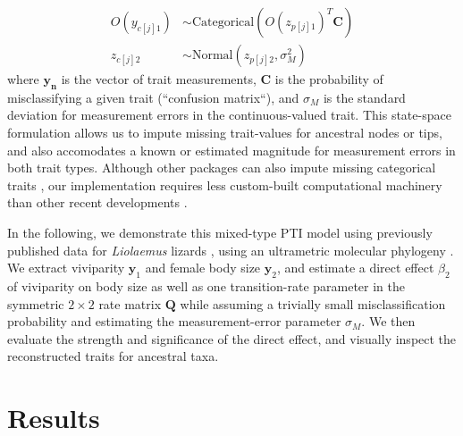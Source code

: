 \documentclass[11pt]{article}
\newcommand{\vect}[1]{\bm{#1}}
\newcommand{\mat}[1]{\bm{#1}}
\begin{document}
\begin{align}
    O(y_{c[j]1}) &\sim \mathrm{Categorical}\left( O(z_{p[j]1})^T \mat{C} \right) \\
    z_{c[j]2} &\sim \mathrm{Normal}\left( z_{p[j]2}, \sigma_M^2 \right)    
\end{align}
where $\vect{y_n}$ is the vector of trait measurements, $\mat{C}$ is the probability of misclassifying a given trait (``confusion matrix``), and $\sigma_M$ is the standard deviation for measurement errors in the continuous-valued trait. This state-space formulation allows us to impute missing trait-values for ancestral nodes or tips, and also accomodates a known or estimated magnitude for measurement errors in both trait types.  Although other packages can also impute missing categorical traits \citep{gendre_benchmarking_2023}, our implementation requires less custom-built computational machinery than other recent developments \citep{lau_efficient_2026}.  

In the following, we demonstrate this mixed-type PTI model using previously published data for \textit{Liolaemus} lizards \citep{dominguez-guerrero_viviparity_2024}, using an ultrametric molecular phylogeny \citep{esquerre_how_2019}.  We extract viviparity $\vect{y}_1$ and female body size $\vect{y}_2$, and estimate a direct effect $\beta_2$ of viviparity on body size as well as one transition-rate parameter in the symmetric $2\times2$ rate matrix $\mat{Q}$ while assuming a trivially small misclassification probability and estimating the measurement-error parameter $\sigma_M$.  We then evaluate the strength and significance of the direct effect, and visually inspect the reconstructed traits for ancestral taxa.  

\section{Results}
\end{document}

